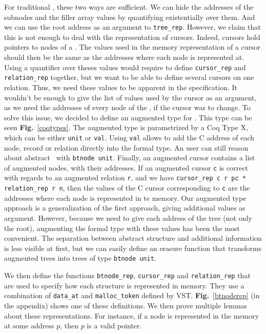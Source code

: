 For traditional \btrees, these two ways are sufficient. We can hide the addresses of the subnodes and the filler array values by quantifying existentially over them.
And we can use the root address as an argument to \lstinline[language=Coq]{tree_rep}.
However, we claim that this is not enough to deal with the representation of cursors.
Indeed, cursors hold pointers to nodes of a \btree.
The values used in the memory representation of a cursor should then be the same as the addresses where each node is represented at.
Using a quantifier over theses values would require to define \lstinline{cursor_rep} and \lstinline{relation_rep} together, but we want to be able to define several cursors on one relation.
Thus, we need these values to be apparent in the specification.
It wouldn't be enough to give the list of values used by the cursor as an argument, as we need the addresses of every node of the \btree, if the cursor was to change.
To solve this issue, we decided to define an augmented type for \btrees.
This type can be seen \textbf{Fig.}~\ref{coqtypes}.
The augmented type is parametrized by a Coq Type X, which can be either \texttt{unit} or \texttt{val}.
Using \texttt{val} allows to add the C address of each node, record or relation directly into the formal type.
An user can still reason about abstract \btrees\ with \texttt{btnode unit}.
Finally, an augmented cursor contains a list of augmented nodes, with their addresses.
If an augmented cursor \texttt{c} is correct with regards to an augmented relation \texttt{r}, and we have \lstinline{cursor_rep c r pc * relation_rep r n}, then the values of the C cursor corresponding to \texttt{c} are the addresses where each node is represented in te memory.
Our augmented type approach is a generalization of the first approach, giving additional values as argument.
However, because we need to give each address of the tree (not only the root), augmenting the formal type with these values has been the most convenient.
The separation between abstract structure and additional information is less visible at first, but we can easily define an erasure function that transforms augmented trees into trees of type \texttt{btnode unit}.

We then define the functions \texttt{btnode\_rep}, \texttt{cursor\_rep} and \texttt{relation\_rep} that are used to specify how each structure is represented in memory.
They use a combination of \texttt{data\_at} and \texttt{malloc\_token} defined by VST.
\textbf{Fig.}~\ref{btnoderep} (in the appendix) shows one of these definitions.
We then prove multiple lemmas about these representations. For instance, if a node is represented in the memory at some address $p$, then $p$ is a valid pointer.

